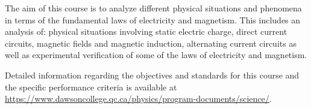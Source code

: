 {The aim of this course is to analyze different physical situations and phenomena in terms of the fundamental laws of electricity and magnetism.  This includes an analysis of: physical situations involving static electric charge, direct current circuits, magnetic fields and magnetic induction, alternating current circuits as well as experimental verification of some of the laws of electricity and magnetism.
\smallskip

Detailed information regarding the objectives and standards for this course and the specific performance criteria is available at \url{https://www.dawsoncollege.qc.ca/physics/program-documents/science/}.}
